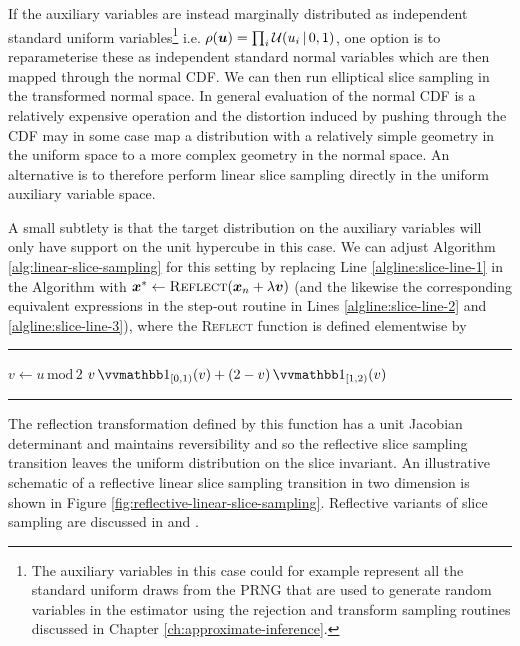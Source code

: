 If the auxiliary variables are instead marginally distributed as independent standard uniform variables\footnote{The auxiliary variables in this case could for example represent all the standard uniform draws from the \ac{PRNG} that are used to generate random variables in the estimator using the rejection and transform sampling routines discussed in Chapter \ref{ch:approximate-inference}.} i.e. $\rho(\boldsymbol{u}) = \prod_{i}\mathcal{U}(u_i \operatorname{|} 0, 1)$, one option is to reparameterise these as independent standard normal variables which are then mapped through the normal \ac{CDF}. We can then run elliptical slice sampling in the transformed normal space. In general evaluation of the normal \ac{CDF} is a relatively expensive operation and the distortion induced by pushing through the \ac{CDF} may in some case map a distribution with a relatively simple geometry in the uniform space to a more complex geometry in the normal space. An alternative is to therefore perform linear slice sampling directly in the uniform auxiliary variable space. 

A small subtlety is that the target distribution on the auxiliary variables will only have support on the unit hypercube in this case. We can adjust Algorithm \ref{alg:linear-slice-sampling} for this setting by replacing Line \ref{algline:slice-line-1} in the Algorithm with $\boldsymbol{x}^* \gets \textsc{Reflect}(\boldsymbol{x}_n + \lambda \boldsymbol{v})$ (and the likewise the corresponding equivalent expressions in the step-out routine in Lines \ref{algline:slice-line-2} and \ref{algline:slice-line-3}), where the \textsc{Reflect} function is defined elementwise by 
{
\vspace{5mm}
\hrule
\small
\vspace{1mm}
\begin{algorithmic}
    \State $v \gets u \,\textrm{mod}\, 2$
    \State \Return $v \ind{[0,1)}(v) + (2-v) \ind{[1,2)}(v)$
  \EndFunction
\end{algorithmic}
\vspace{2mm}
\hrule
\vspace{3mm}
}
The reflection transformation defined by this function has a unit Jacobian determinant and maintains reversibility and so the reflective slice sampling transition leaves the uniform distribution on the slice invariant. An illustrative schematic of a reflective linear slice sampling transition in two dimension is shown in Figure \ref{fig:reflective-linear-slice-sampling}. Reflective variants of slice sampling are discussed in \citep{neal2003slice} and \citep{downs2000nonnegative}.


